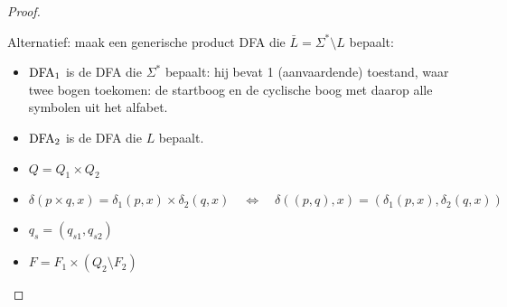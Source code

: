 \documentclass[../aanvullingen_cursus.tex]{subfiles}
\begin{document}
\begin{proof}
\begin{itemize}
		Alternatief: maak een generische product DFA die \(\bar{L}=\Sigma^*\setminus L \) bepaalt:
		\begin{itemize}
			\item \(\text{DFA}_1\) is de DFA die \(\Sigma^*\) bepaalt: hij bevat 1 (aanvaardende) toestand, waar twee bogen toekomen: de startboog en de cyclische boog met daarop alle symbolen uit het alfabet.
			\item \(\text{DFA}_2\) is de DFA die \(L\) bepaalt.
			\item \(Q=Q_1 \times Q_2\)
			\item \(\delta(p \times q, x)=\delta_1(p,x) \times \delta_2(q,x) \quad \Leftrightarrow \quad
			\delta\left((p,q), x\right)=\left(\delta_1(p,x), \delta_2(q,x)\right)\)
			\item \(q_s = (q_{s1},q_{s2})\)
			\item \(F = F_1 \times (Q_2 \setminus F_2)\)
		\end{itemize}
	\end{itemize}
\end{proof}
\end{document}
